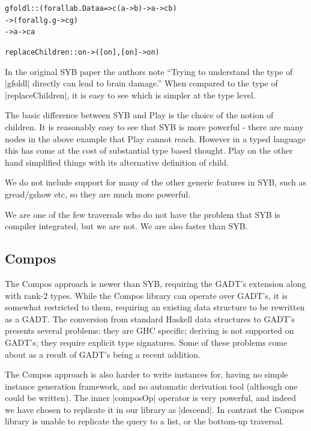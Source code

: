 \documentclass[preprint]{sigplanconf}
\newenvironment{code}{\begin{alltt}\small}{\end{alltt}}
\begin{document}
\begin{code}
gfoldl  ::  (forall a b . Data a => c (a -> b) -> a -> c b)
        ->  (forall g . g -> c g)
        ->  a -> c a

replaceChildren :: on -> ([on], [on] -> on)
\end{code}

In the original SYB paper the authors note ``Trying to understand the type of |gfoldl| directly can lead to brain damage.'' When compared to the type of |replaceChildren|, it is easy to see which is simpler at the type level.

\begin{code}
\end{code}

The basic difference between SYB and Play is the choice of the notion of children. It is reasonably easy to see that SYB is more powerful - there are many nodes in the above example that Play cannot reach. However in a typed language this has come at the cost of substantial type based thought. Play on the other hand simplified things with its alternative definition of child.

We do not include support for many of the other generic features in SYB, such as gread/gshow etc, so they are much more powerful.

We are one of the few traversals who do not have the problem that SYB is compiler integrated, but we are not. We are also faster than SYB.

\subsection{Compos}

The Compos approach is newer than SYB, requiring the GADT's extension along with rank-2 types. While the Compos library can operate over GADT's, it is somewhat restricted to them, requiring an existing data structure to be rewritten as a GADT. The conversion from standard Haskell data structures to GADT's presents several problems: they are GHC specific; deriving is not supported on GADT's; they require explicit type signatures. Some of these problems come about as a result of GADT's being a recent addition.

The Compos approach is also harder to write instances for, having no simple instance generation framework, and no automatic derivation tool (although one could be written). The inner |composOp| operator is very powerful, and indeed we have chosen to replicate it in our library as |descend|. In contrast the Compos library is unable to replicate the query to a list, or the bottom-up traversal.
\end{document}
